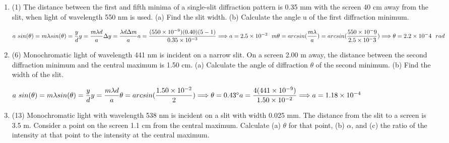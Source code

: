 \documentclass[fleqn]{article}
\begin{document}
  \begin{enumerate}
    \item (1) The distance between the first and fifth minima of a
    single-slit diffraction pattern is 0.35 mm with the screen 40 cm
    away from the slit, when light of wavelength 550 nm is used. (a)
    Find the slit width. (b) Calculate the angle u of the first diffraction
    minimum.

      \textcolor{hwColor}{
        $
          a~sin(\theta)=m \lambda \\
          sin(\theta)=\dfrac{y}{d} \\
          \\
          y=\dfrac{m \lambda d}{a} \\
          \\
          \Delta y=\dfrac{\lambda d \Delta m}{a} \\
          \\
          a=\dfrac{(550 \times 10^{-9})(0.40)(5-1)}{0.35 \times 10^{-3}} \Longrightarrow a=2.5 \times 10^{-3} ~~ m
          \\
          \theta=arcsin(\dfrac{m\lambda}{a})=arcsin(\dfrac{550 \times 10^-9}{2.5 \times 10^-3}) \Longrightarrow \theta=2.2 \times 10^-4 ~~ rad
        $
      }
    
    \item (6) Monochromatic light of wavelength 441 nm is incident on a
    narrow slit. On a screen 2.00 m away, the distance between the second diffraction minimum and the central maximum is 1.50 cm. (a)
    Calculate the angle of diffraction $\theta$ of the second minimum. (b)
    Find the width of the slit.

      \textcolor{hwColor}{
        $
          a~sin(\theta)=m \lambda \\
          sin(\theta)=\dfrac{y}{d} \\
          \\
          y=\dfrac{m \lambda d}{a} \\
          \\
          \theta=arcsin(\dfrac{1.50 \times 10^{-2}}{2}) \Longrightarrow \theta=0.43^{\circ} \\
          \\
          a=\dfrac{4(441 \times 10^{-9})}{1.50 \times 10^{-2}} \Longrightarrow a=1.18 \times 10^{-4}
        $
      }

    \item (13) Monochromatic light with wavelength 538 nm is incident on
    a slit with width 0.025 mm. The distance from the slit to a screen is
    3.5 m. Consider a point on the screen 1.1 cm from the central maximum. Calculate (a) $\theta$ for that point, (b) $\alpha$, and (c) the ratio of the
    intensity at that point to the intensity at the central maximum.


\end{enumerate}
\end{document}
